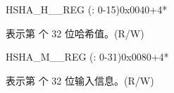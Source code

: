 \begin{register}{H}{SHA\_H\_\_REG (: 0-15)}{0x0040+4*}\label{regdesc:SHAHNREG}
%
\regnewline%
\begin{regdesc}\begin{reglist}
\label{fielddesc:SHAH0}\item [SHA\_H\_\regindex{n}] 表示第  个 32 位哈希值。(R/W)
\end{reglist}\end{regdesc}
\end{register}

\begin{register}{H}{SHA\_M\_\_REG (: 0-31)}{0x0080+4*}\label{regdesc:SHAMNREG}
%
\begin{regdesc}\begin{reglist}
\label{fielddesc:SHAM0}\item [SHA\_M\_\regindex{n}] 表示第  个 32 位输入信息。(R/W)
\end{reglist}\end{regdesc}
\end{register}
